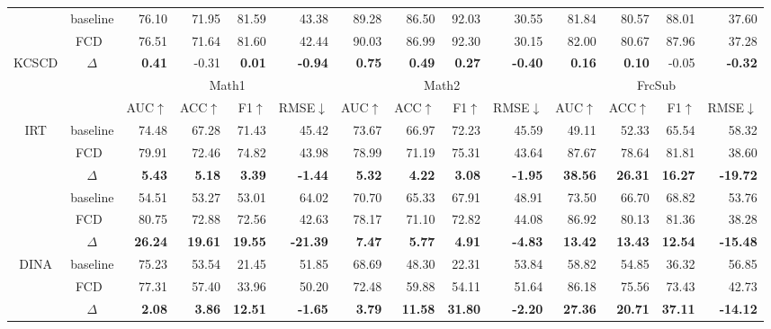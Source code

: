 \documentclass[runningheads]{llncs}
\def\mymethod{FCD}
\newcommand{\redbf}[1]{\textcolor{myred}{\textbf{#1}}} %
\newcommand{\green}[1]{\textcolor{mygreen}{#1}}       %
\begin{document}
\begin{table}[!htpb]
{\begin{tabular}{cc|rrrr|rrrr|rrrr}
& baseline & 76.10 & 71.95 & 81.59 & 43.38 & 89.28 & 86.50 & 92.03 & 30.55 & 81.84 & 80.57 & 88.01 & 37.60 \\
 & \mymethod\ & 76.51 & 71.64 & 81.60 & 42.44 & 90.03 & 86.99 & 92.30 & 30.15 & 82.00 & 80.67 & 87.96 & 37.28 \\
\multirow{-3}{*}{KCSCD} & $\Delta$ & \redbf{0.41} & \green{-0.31} & \redbf{0.01} & \redbf{-0.94} & \redbf{0.75} & \redbf{0.49} & \redbf{0.27} & \redbf{-0.40} & \redbf{0.16} & \redbf{0.10} & \green{-0.05} & \redbf{-0.32} \\
\midrule
& & \multicolumn{4}{c|}{Math1} & \multicolumn{4}{c|}{Math2} & \multicolumn{4}{c}{FrcSub} \\
\cmidrule(lr){3-14}
 & & AUC$\uparrow$ & ACC$\uparrow$ & F1$\uparrow$ & RMSE$\downarrow$ & AUC$\uparrow$ & ACC$\uparrow$ & F1$\uparrow$ & RMSE$\downarrow$ & AUC$\uparrow$ & ACC$\uparrow$ & F1$\uparrow$ & RMSE$\downarrow$ \\
\midrule
\multirow{3}{*}{IRT} & baseline & 74.48 & 67.28 & 71.43 & 45.42 & 73.67 & 66.97 & 72.23 & 45.59 & 49.11 & 52.33 & 65.54 & 58.32 \\
 & \mymethod\ & 79.91 & 72.46 & 74.82 & 43.98 & 78.99 & 71.19 & 75.31 & 43.64 & 87.67 & 78.64 & 81.81 & 38.60 \\
 & $\Delta$ & \redbf{5.43} & \redbf{5.18} & \redbf{3.39} & \redbf{-1.44} & \redbf{5.32} & \redbf{4.22} & \redbf{3.08} & \redbf{-1.95} & \redbf{38.56} & \redbf{26.31} & \redbf{16.27} & \redbf{-19.72} \\

\rowcolor{mybgc}& baseline & 54.51 & 53.27 & 53.01 & 64.02 & 70.70 & 65.33 & 67.91 & 48.91 & 73.50 & 66.70 & 68.82 & 53.76 \\
\rowcolor{mybgc} & \mymethod\ & 80.75 & 72.88 & 72.56 & 42.63 & 78.17 & 71.10 & 72.82 & 44.08 & 86.92 & 80.13 & 81.36 & 38.28 \\
\rowcolor{mybgc} \multirow{-3}{*}{MIRT} & $\Delta$ & \redbf{26.24} & \redbf{19.61} & \redbf{19.55} & \redbf{-21.39} & \redbf{7.47} & \redbf{5.77} & \redbf{4.91} & \redbf{-4.83} & \redbf{13.42} & \redbf{13.43} & \redbf{12.54} & \redbf{-15.48} \\

\multirow{3}{*}{DINA} & baseline & 75.23 & 53.54 & 21.45 & 51.85 & 68.69 & 48.30 & 22.31 & 53.84 & 58.82 & 54.85 & 36.32 & 56.85 \\
 & \mymethod\ & 77.31 & 57.40 & 33.96 & 50.20 & 72.48 & 59.88 & 54.11 & 51.64 & 86.18 & 75.56 & 73.43 & 42.73 \\
 & $\Delta$ & \redbf{2.08} & \redbf{3.86} & \redbf{12.51} & \redbf{-1.65} & \redbf{3.79} & \redbf{11.58} & \redbf{31.80} & \redbf{-2.20} & \redbf{27.36} & \redbf{20.71} & \redbf{37.11} & \redbf{-14.12} \\


\end{tabular}}
\end{table}
\end{document}
